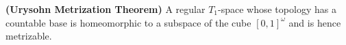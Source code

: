 \textbf{(Urysohn Metrization Theorem)} A regular $T_1$-space whose topology has a countable base is homeomorphic to a subspace of the cube $[0,1]^\omega$ and is hence metrizable.
